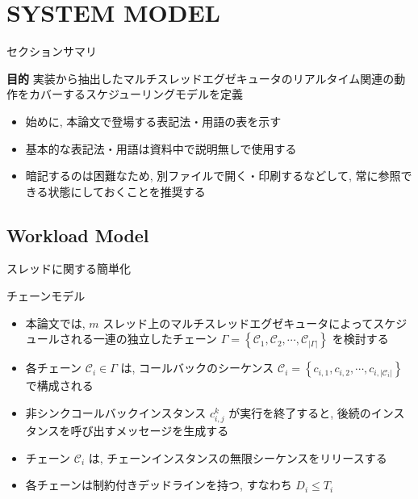 
\section{SYSTEM MODEL}
\label{sec: system_model}

\begin{frame}{セクションサマリ}
    \begin{itembox}[l]{\textbf{目的}}
        実装から抽出したマルチスレッドエグゼキュータのリアルタイム関連の動作をカバーするスケジューリングモデルを定義
    \end{itembox}
\end{frame}

\begin{frame}{}
    \begin{itemize}
        \item 始めに, 本論文で登場する表記法・用語の表を示す
        \item 基本的な表記法・用語は資料中で説明無しで使用する
        \item 暗記するのは困難なため, 別ファイルで開く・印刷するなどして, 常に参照できる状態にしておくことを推奨する
    \end{itemize}
\end{frame}



\subsection{Workload Model}
\label{ssec: workload_model}

\begin{frame}{スレッドに関する簡単化}
\end{frame}

\begin{frame}{チェーンモデル}
    \begin{itemize}
        \item 本論文では, $m$ スレッド上のマルチスレッドエグゼキュータによってスケジュールされる一連の独立したチェーン $\Gamma=\left\{\mathcal{C}_{1}, \mathcal{C}_{2}, \cdots, \mathcal{C}_{|\Gamma|}\right\}$ を検討する
        \item 各チェーン $\mathcal{C}_{i} \in \Gamma$ は, コールバックのシーケンス $\mathcal{C}_{i}=\left\{c_{i, 1}, c_{i, 2}, \cdots, c_{i,\left|\mathcal{C}_{i}\right|}\right\}$ で構成される
        \item 非シンクコールバックインスタンス $c_{i, j}^{k}$ が実行を終了すると, 後続のインスタンスを呼び出すメッセージを生成する
        \item チェーン $\mathcal{C}_{i}$ は, チェーンインスタンスの無限シーケンスをリリースする
        \item 各チェーンは制約付きデッドラインを持つ, すなわち $D_{i} \leq T_{i}$
    \end{itemize}
\end{frame}

